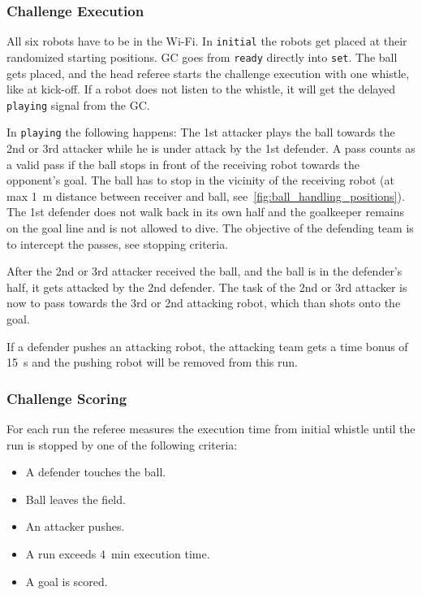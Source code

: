     \subsubsection{Challenge Execution}

        All six robots have to be in the Wi-Fi. In \texttt{initial} the robots get placed at their randomized starting positions. GC goes from \texttt{ready} directly into \texttt{set}. The ball gets placed, and the head referee starts the challenge execution with one whistle, like at kick-off. If a robot does not listen to the whistle, it will get the delayed \texttt{playing} signal from the GC.

        In \texttt{playing} the following happens: The 1st attacker plays the ball towards the 2nd or 3rd attacker while he is under attack by the 1st defender.
        A pass counts as a valid pass if the ball stops in front of the receiving robot towards the opponent's goal. The ball has to stop in the vicinity of the receiving robot (at max \qty{1}{\metre} distance between receiver and ball, see~\cref{fig:ball_handling_positions}).
        The 1st defender does not walk back in its own half and the goalkeeper remains on the goal line and is not allowed to dive. The objective of the defending team is to intercept the passes, see stopping criteria.

        After the 2nd or 3rd attacker received the ball, and the ball is in the defender's half, it gets attacked by the 2nd defender. The task of the 2nd or 3rd attacker is now to pass towards the 3rd or 2nd attacking robot, which than shots onto the goal.

        If a defender pushes an attacking robot, the attacking team gets a time bonus of \qty{15}{\second} and the pushing robot will be removed from this run.

    \subsubsection{Challenge Scoring}

        For each run the referee measures the execution time from initial whistle until the run is stopped by one of the following criteria:

        \begin{itemize}
            \item A defender touches the ball.
            \item Ball leaves the field.
            \item An attacker pushes.
            \item A run exceeds \qty{4}{\minute} execution time.
            \item A goal is scored.
        \end{itemize}

